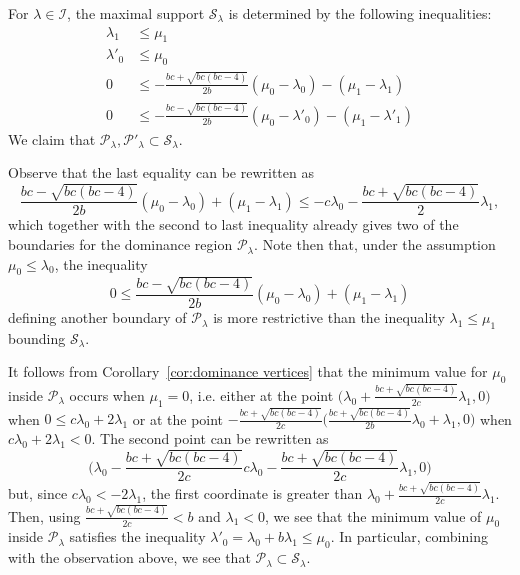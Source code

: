 \documentclass{amsart}
\numberwithin{theorem}{section}
\newcommand{\cI}{\mathcal{I}}
\newcommand{\cP}{\mathcal{P}}
\newcommand{\cS}{\mathcal{S}}
\begin{document}
  For $\lambda\in\cI$, the maximal support $\cS_\lambda$ is determined by the following inequalities:
  \begin{align*}
    \lambda_1 &\leq \mu_1\\
    \lambda'_0 &\leq \mu_0\\
    0 &\leq -\frac{b c+\sqrt{b c (b c-4)}}{2 b}(\mu_0-\lambda_0)-(\mu_1-\lambda_1)\\
    0 &\leq -\frac{b c-\sqrt{b c (b c-4)}}{2 b}(\mu_0-\lambda'_0) -(\mu_1-\lambda'_1)
  \end{align*}
  We claim that $\cP_\lambda,\cP'_\lambda\subset\cS_\lambda$.

  Observe that the last equality can be rewritten as
  \[ \frac{b c-\sqrt{b c (b c-4)}}{2 b}(\mu_0-\lambda_0) + (\mu_1-\lambda_1) \leq -c\lambda_0 - \frac{b c + \sqrt{b c (b c-4)}}{2 } \lambda_1,\]
  which together with the second to last inequality already gives two of the boundaries for the dominance region $\cP_\lambda$.
  Note then that, under the assumption $\mu_0\leq\lambda_0$, the inequality 
  \[0 \leq \frac{b c-\sqrt{b c (b c-4)}}{2 b}(\mu_0-\lambda_0)+(\mu_1-\lambda_1)\]
  defining another boundary of $\cP_\lambda$ is more restrictive than the inequality $\lambda_1\leq\mu_1$ bounding $\cS_\lambda$.

  It follows from Corollary~\ref{cor:dominance vertices} that the minimum value for $\mu_0$ inside $\cP_\lambda$ occurs when $\mu_1=0$, i.e. either at the point $\big( \lambda_0+\frac{bc+\sqrt{bc(bc-4)}}{2c}\lambda_1 , 0 \big)$ when $0 \leq c\lambda_0+2\lambda_1$ or at the point $-\frac{bc+\sqrt{bc(bc-4)}}{2c} \big( \frac{bc+\sqrt{bc(bc-4)}}{2b}\lambda_0+\lambda_1 , 0 \big)$ when $c\lambda_0+2\lambda_1<0$.
  The second point can be rewritten as
  \[\big(\lambda_0 -\frac{bc+\sqrt{bc(bc-4)}}{2c} c\lambda_0-\frac{bc+\sqrt{bc(bc-4)}}{2c} \lambda_1 , 0 \big)\]
  but, since $c\lambda_0 < -2\lambda_1$, the first coordinate is greater than $\lambda_0+\frac{bc+\sqrt{bc(bc-4)}}{2c}\lambda_1$.
  Then, using $\frac{bc+\sqrt{bc(bc-4)}}{2c}<b$ and $\lambda_1<0$, we see that the minimum value of $\mu_0$ inside $\cP_\lambda$ satisfies the inequality $\lambda'_0=\lambda_0+b\lambda_1 \leq \mu_0$.
  In particular, combining with the observation above, we see that $\cP_\lambda\subset\cS_\lambda$.
\end{document}
